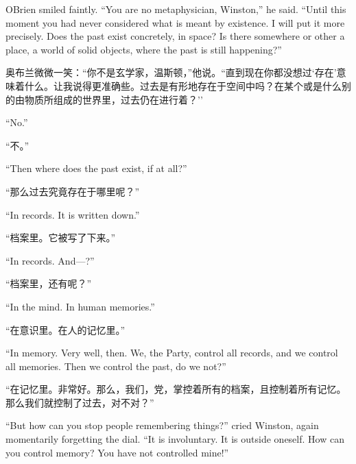 \begin{paracol}{2}
\switchcolumn*

O\textquotesingle Brien smiled faintly. ``You are no metaphysician,
Winston,'' he said. ``Until this moment you had never considered what is
meant by existence. I will put it more precisely. Does the past exist
concretely, in space? Is there somewhere or other a place, a world of
solid objects, where the past is still happening?''

\switchcolumn

奥布兰微微一笑：``你不是玄学家，温斯顿，''他说。``直到现在你都没想过`存在'意味着什么。让我说得更准确些。过去是有形地存在于空间中吗？在某个或是什么别的由物质所组成的世界里，过去仍在进行着？''

\switchcolumn*

``No.''

\switchcolumn

``不。''

\switchcolumn*

``Then where does the past exist, if at all?''

\switchcolumn

``那么过去究竟存在于哪里呢？''

\switchcolumn*

``In records. It is written down.''

\switchcolumn

``档案里。它被写了下来。''

\switchcolumn*

``In records. And---?''

\switchcolumn

``档案里，还有呢？''

\switchcolumn*

``In the mind. In human memories.''

\switchcolumn

``在意识里。在人的记忆里。''

\switchcolumn*

``In memory. Very well, then. We, the Party, control all records, and we
control all memories. Then we control the past, do we not?''

\switchcolumn

``在记忆里。非常好。那么，我们，党，掌控着所有的档案，且控制着所有记忆。那么我们就控制了过去，对不对？''

\switchcolumn*

``But how can you stop people remembering things?'' cried Winston, again
momentarily forgetting the dial. ``It is involuntary. It is outside
oneself. How can you control memory? You have not controlled mine!''


\end{paracol}
